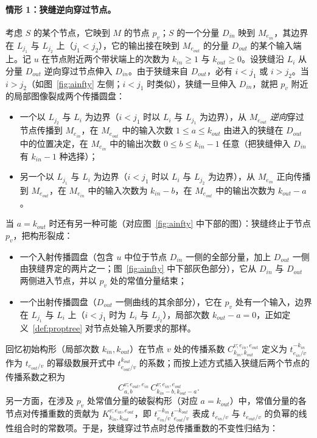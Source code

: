 \paragraph{情形 1：狭缝逆向穿过节点。}
考虑 $S$ 的某个节点，它映到 $M$ 的节点 $p_v$；$S$ 的一个分量 $D_{in}$ 映到 $M_{e_{in}}$，其边界在 $L_{j_1}$ 与 $L_{j_2}$ 上（$j_1<j_2$），它的输出接在映到 $M_{e_{out}}$ 的分量 $D_{out}$ 的某个输入端上。记 $u$ 在节点附近两个带状端上的次数为 $k_{in}\geq 1$ 与 $k_{out}\geq 0$。设狭缝沿 $L_i$ 从分量 $D_{out}$ 逆向穿过节点伸入 $D_{in}$。由于狭缝来自 $D_{out}$，必有 $i<j_1$ 或 $i>j_2$。当 $i>j_2$（如图~\ref{fig:ainfty} 左侧；$i<j_1$ 时类似），狭缝一旦伸入 $D_{in}$，就把 $p_v$ 附近的局部图像裂成两个传播圆盘：

\begin{itemize}
\item 一个以 $L_{j_2}$ 与 $L_i$ 为边界（$i<j_1$ 时以 $L_i$ 与 $L_{j_1}$ 为边界），从 $M_{e_{out}}$ \emph{逆向}穿过节点传播到 $M_{e_{in}}$，在 $M_{e_{out}}$ 中的输入次数 $1\leq a\leq k_{out}$ 由进入的狭缝在 $D_{out}$ 中的位置决定，在 $M_{e_{in}}$ 中的输出次数 $0\leq b\leq k_{in}-1$ 任意（把狭缝伸入 $D_{in}$ 有 $k_{in}-1$ 种选择）；
\item 另一个以 $L_{j_1}$ 与 $L_i$ 为边界（$i<j_1$ 时以 $L_i$ 与 $L_{j_2}$ 为边界），从 $M_{e_{in}}$ 正向传播到 $M_{e_{out}}$，在 $M_{e_{in}}$ 中的输入次数为 $k_{in}-b$，在 $M_{e_{out}}$ 中的输出次数为 $k_{out}-a$。
\end{itemize}

当 $a=k_{out}$ 时还有另一种可能（对应图~\ref{fig:ainfty} 中下部的图）：狭缝终止于节点 $p_v$，把构形裂成：
\begin{itemize}
\item 一个入射传播圆盘（包含 $u$ 中位于节点 $D_{in}$ 一侧的全部分量，加上 $D_{out}$ 一侧由狭缝界定的两片之一；图~\ref{fig:ainfty} 中下部灰色部分），它从 $D_{in}$ 与 $D_{out}$ 两侧进入节点，并以 $p_v$ 处的常值分量结束；
\item 一个出射传播圆盘（$D_{out}$ 一侧曲线的其余部分），它在 $p_v$ 处有一个输入，边界在 $L_{j_1}$ 与 $L_i$ 上（$i<j_1$ 时为 $L_i$ 与 $L_{j_2}$），局部次数 $k_{out}-a=0$，正如定义~\ref{def:proptree} 对节点处输入所要求的那样。
\end{itemize}

回忆初始构形（局部次数 $k_{in},k_{out}$）在节点 $v$ 处的传播系数 $C^{v;e_{in},e_{out}}_{k_{in},k_{out}}$ 定义为 $t_{e_{in}/v}^{-k_{in}}$ 作为 $t_{e_{out}/v}$ 的幂级数展开式中 $t_{e_{out}/v}^{k_{out}}$ 的系数；而按上述方式插入狭缝后两个节点的传播系数之积为
\[
C^{v;e_{out},e_{in}}_{a,b}\,C^{v;e_{in},e_{out}}_{k_{in}-b,k_{out}-a}.
\]
另一方面，在涉及 $p_v$ 处常值分量的破裂构形（对应 $a=k_{out}$）中，常值分量的各节点对传播重数的贡献为 $K^{v;e_{in},e_{out}}_{k_{in},k_{out}}$，即 $t_{e_{in}/v}^{-k_{in}}t_{e_{out}/v}^{-k_{out}}$ 表成 $t_{e_{in}/v}$ 与 $t_{e_{out}/v}$ 的负幂的线性组合时的常数项。于是，狭缝穿过节点时总传播重数的不变性归结为：

